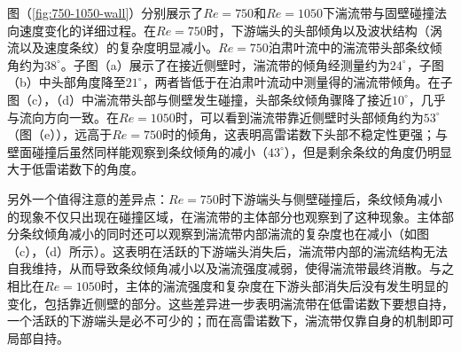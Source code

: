 图（\ref{fig:750-1050-wall}）分别展示了$Re = 750$和$Re = 1050$下湍流带与固壁碰撞法向速度变化的详细过程。在$Re = 750$时，下游端头的头部倾角以及波状结构（涡流以及速度条纹）的复杂度明显减小。$Re = 750$泊肃叶流中的湍流带头部条纹倾角约为$38^\circ$\cite{Xiao2020}。子图（a）展示了在接近侧壁时，湍流带的倾角经测量约为$24^\circ$，子图（b）中头部角度降至$21^\circ$，两者皆低于在泊肃叶流动中测量得的湍流带倾角。在子图（c），（d）中湍流带头部与侧壁发生碰撞，头部条纹倾角骤降了接近$10^\circ$，几乎与流向方向一致。在$Re = 1050$时，可以看到湍流带靠近侧壁时头部倾角约为$53^\circ$（图（e）），远高于$Re = 750$时的倾角，这表明高雷诺数下头部不稳定性更强；与壁面碰撞后虽然同样能观察到条纹倾角的减小（$43^\circ$），但是剩余条纹的角度仍明显大于低雷诺数下的角度。

另外一个值得注意的差异点：$Re = 750$时下游端头与侧壁碰撞后，条纹倾角减小的现象不仅只出现在碰撞区域，在湍流带的主体部分也观察到了这种现象。主体部分条纹倾角减小的同时还可以观察到湍流带内部湍流的复杂度也在减小（如图（c），（d）所示）。这表明在活跃的下游端头消失后，湍流带内部的湍流结构无法自我维持，从而导致条纹倾角减小以及湍流强度减弱，使得湍流带最终消散。与之相比在$Re = 1050$时，主体的湍流强度和复杂度在下游头部消失后没有发生明显的变化，包括靠近侧壁的部分。这些差异进一步表明湍流带在低雷诺数下要想自持，一个活跃的下游端头是必不可少的；而在高雷诺数下，湍流带仅靠自身的机制即可局部自持。

